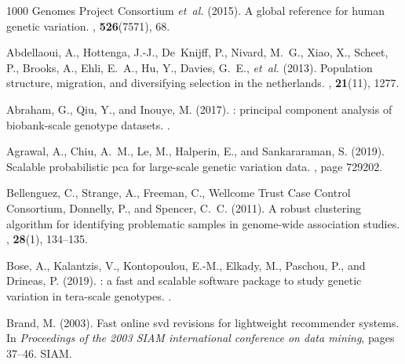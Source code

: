 \documentclass{bioinfo}
\begin{document}
\begin{thebibliography}{}
	
	{1000 Genomes Project Consortium} {\em et~al.} (2015).
	\newblock A global reference for human genetic variation.
	, {\bf 526}(7571), 68.
	
	Abdellaoui, A., Hottenga, J.-J., De~Knijff, P., Nivard, M.~G., Xiao, X.,
	Scheet, P., Brooks, A., Ehli, E.~A., Hu, Y., Davies, G.~E., {\em et~al.}
	(2013).
	\newblock Population structure, migration, and diversifying selection in the
	netherlands.
	, {\bf 21}(11), 1277.
	
	Abraham, G., Qiu, Y., and Inouye, M. (2017).
	: principal component analysis of biobank-scale genotype
	datasets.
	.
	
	Agrawal, A., Chiu, A.~M., Le, M., Halperin, E., and Sankararaman, S. (2019).
	\newblock Scalable probabilistic pca for large-scale genetic variation data.
	, page 729202.
	
	Bellenguez, C., Strange, A., Freeman, C., {Wellcome Trust Case Control
		Consortium}, Donnelly, P., and Spencer, C.~C. (2011).
	\newblock A robust clustering algorithm for identifying problematic samples in
	genome-wide association studies.
	, {\bf 28}(1), 134--135.
	
	Bose, A., Kalantzis, V., Kontopoulou, E.-M., Elkady, M., Paschou, P., and
	Drineas, P. (2019).
	: a fast and scalable software package to study genetic
	variation in tera-scale genotypes.
	.
	
	Brand, M. (2003).
	\newblock Fast online svd revisions for lightweight recommender systems.
	\newblock In {\em Proceedings of the 2003 {SIAM} international conference on
		data mining\/}, pages 37--46. SIAM.
	

\end{thebibliography}
\end{document}
